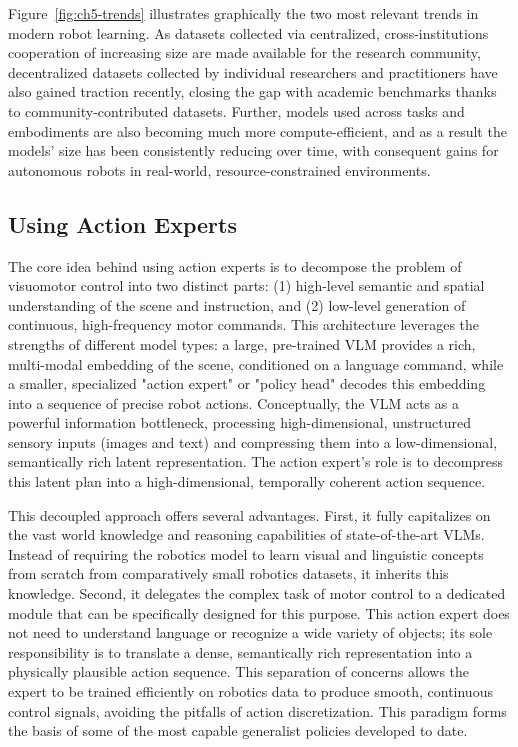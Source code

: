 Figure~\ref{fig:ch5-trends} illustrates graphically the two most relevant trends in modern robot learning.
As datasets collected via centralized, cross-institutions cooperation of increasing size are made available for the research community, decentralized datasets collected by individual researchers and practitioners have also gained traction recently, closing the gap with academic benchmarks thanks to community-contributed datasets.
Further, models used across tasks and embodiments are also becoming much more compute-efficient, and as a result the models' size has been consistently reducing over time, with consequent gains for autonomous robots in real-world, resource-constrained environments.

\subsection{Using Action Experts}
The core idea behind using action experts is to decompose the problem of visuomotor control into two distinct parts: (1) high-level semantic and spatial understanding of the scene and instruction, and (2) low-level generation of continuous, high-frequency motor commands.
This architecture leverages the strengths of different model types: a large, pre-trained VLM provides a rich, multi-modal embedding of the scene, conditioned on a language command, while a smaller, specialized "action expert" or "policy head" decodes this embedding into a sequence of precise robot actions.
Conceptually, the VLM acts as a powerful information bottleneck, processing high-dimensional, unstructured sensory inputs (images and text) and compressing them into a low-dimensional, semantically rich latent representation. The action expert's role is to decompress this latent plan into a high-dimensional, temporally coherent action sequence.

This decoupled approach offers several advantages.
First, it fully capitalizes on the vast world knowledge and reasoning capabilities of state-of-the-art VLMs.
Instead of requiring the robotics model to learn visual and linguistic concepts from scratch from comparatively small robotics datasets, it inherits this knowledge.
Second, it delegates the complex task of motor control to a dedicated module that can be specifically designed for this purpose.
This action expert does not need to understand language or recognize a wide variety of objects; its sole responsibility is to translate a dense, semantically rich representation into a physically plausible action sequence.
This separation of concerns allows the expert to be trained efficiently on robotics data to produce smooth, continuous control signals, avoiding the pitfalls of action discretization.
This paradigm forms the basis of some of the most capable generalist policies developed to date.

